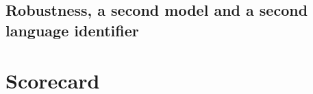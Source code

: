 \documentclass[10pt,a4paper]{article}
\newcommand{\code}[1]{{\small\texttt{#1}}}
\begin{document}
\subsection{Robustness, a second model and a second language identifier}
\RThreeRobust

\RThreeSecond

\begin{table}[H]\footnotesize\centering
{}
\caption{The same frozen methods on \code{Qwen2.5-0.5B-Instruct}, with no retuning. Columns as in Table~\ref{tab:r3}.}
\end{table}

\RThreeDetector

\section{Scorecard}
\end{document}
